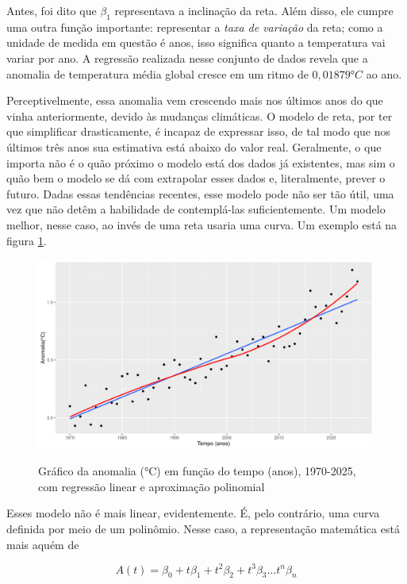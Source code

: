 Antes, foi dito que $\beta_1$ representava a inclinação da reta.
Além disso, ele cumpre uma outra função importante: representar a \textit{taxa de variação} da reta; como a unidade de medida em questão é anos, isso significa quanto a temperatura vai variar por ano.
A regressão realizada nesse conjunto de dados revela que a anomalia de temperatura média global cresce em um ritmo de $0,01879 °C$ ao ano.

Perceptivelmente, essa anomalia vem crescendo mais nos últimos anos do que vinha anteriormente, devido às mudanças climáticas.
O modelo de reta, por ter que simplificar drasticamente, é incapaz de expressar isso, de tal modo que nos últimos três anos sua estimativa está abaixo do valor real.
Geralmente, o que importa não é o quão próximo o modelo está dos dados já existentes, mas sim o quão bem o modelo se dá com extrapolar esses dados e, literalmente, prever o futuro.
Dadas essas tendências recentes, esse modelo pode não ser tão útil, uma vez que não detêm a habilidade de contemplá-las suficientemente.
Um modelo melhor, nesse caso, ao invés de uma reta usaria uma curva.
Um exemplo está na figura \ref{fig:2:anom-3-scatter+reg+poly}.

\begin{figure}
    \centering
    \caption{Gráfico da anomalia (°C) em função do tempo (anos), 1970-2025, com regressão linear e aproximação polinomial}
    \includegraphics[width=\linewidth]{static/R/plot/anom-5-scatter+reg+poly.png}
    \label{fig:2:anom-3-scatter+reg+poly}
\end{figure}

Esses modelo não é mais linear, evidentemente.
É, pelo contrário, uma curva definida por meio de um polinômio.
Nesse caso, a representação matemática está mais aquém de

\begin{equation}
A(t) = \beta_0 + t \beta_1 + t^2 \beta_2 + t^3 \beta_3 \dots t^n \beta_n 
\end{equation}


